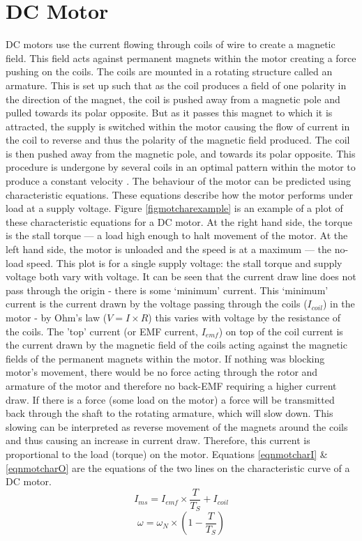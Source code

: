 \documentclass[twoside,a4]{report}
\def\br{\newline \newline \noindent}
\begin{document}
	\section*{DC Motor}
	DC motors use the current flowing through coils of wire to create a magnetic field. This field acts against permanent magnets within the motor creating a force pushing on the coils. The coils are mounted in a rotating structure called an armature. This is set up such that as the coil produces a field of one polarity in the direction of the magnet, the coil is pushed away from a magnetic pole and pulled towards its polar opposite. But as it passes this magnet to which it is attracted, the supply is switched within the motor causing the flow of current in the coil to reverse and thus the polarity of the magnetic field produced. The coil is then pushed away from the magnetic pole, and towards its polar opposite. This procedure is undergone by several coils in an optimal pattern within the motor to produce a constant velocity \cite{backdcmotor}.
	\br
	The behaviour of the motor can be predicted using characteristic equations. These equations describe how the motor performs under load at a supply voltage. Figure \ref{figmotcharexample} is an example of a plot of these characteristic equations for a DC motor. At the right hand side, the torque is the stall torque --- a load high enough to halt movement of the motor. At the left hand side, the motor is unloaded and the speed is at a maximum --- the no-load speed. This plot is for a single supply voltage: the stall torque and supply voltage both vary with voltage. 
	\br
	It can be seen that the current draw line does not pass through the origin - there is some `minimum' current. This `minimum' current is the current drawn by the voltage passing through the coils ($I_{coil}$) in the motor - by Ohm's law ($V = I \times R$) this varies with voltage by the resistance of the coils. The 'top' current (or EMF current, $I_{emf}$) on top of the coil current is the current drawn by the magnetic field of the coils acting against the magnetic fields of the permanent magnets within the motor. If nothing was blocking motor's movement, there would be no force acting through the rotor and armature of the motor and therefore no back-EMF requiring a higher current draw. If there is a force (some load on the motor) a force will be transmitted back through the shaft to the rotating armature, which will slow down. This slowing can be interpreted as reverse movement of the magnets around the coils and thus causing an increase in current draw. Therefore, this current is proportional to the load (torque) on the motor. Equations \ref{eqnmotcharI} \& \ref{eqnmotcharO} are the equations of the two lines on the characteristic curve of a DC motor.
	\begin{equation}
		I_{ms} = I_{emf} \times \frac{T}{T_S} + I_{coil}
		\label{eqnmotcharI}
	\end{equation}
	\begin{equation}
		\omega = \omega_N \times \left(1 - \frac{T}{T_S}\right)
		\label{eqnmotcharO}
	\end{equation}
	
\end{document}
